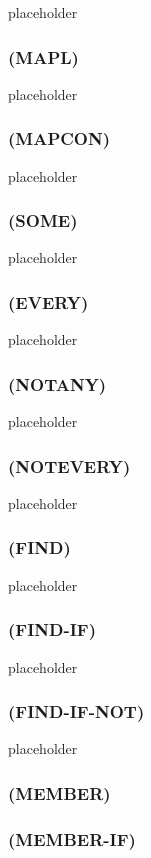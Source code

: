 \documentclass[11pt]{article}
\begin{document}
placeholder
\subsubsection{(MAPL)}
\label{sec-4-15-5}

placeholder
\subsubsection{(MAPCON)}
\label{sec-4-15-6}

placeholder
\subsubsection{(SOME)}
\label{sec-4-15-7}

placeholder
\subsubsection{(EVERY)}
\label{sec-4-15-8}

placeholder
\subsubsection{(NOTANY)}
\label{sec-4-15-9}

placeholder
\subsubsection{(NOTEVERY)}
\label{sec-4-15-10}

placeholder
\subsubsection{(FIND)}
\label{sec-4-15-11}

placeholder
\subsubsection{(FIND-IF)}
\label{sec-4-15-12}

placeholder
\subsubsection{(FIND-IF-NOT)}
\label{sec-4-15-13}

placeholder
\subsubsection{(MEMBER)}
\label{sec-4-15-14}
\subsubsection{(MEMBER-IF)}
\label{sec-4-15-15}
\end{document}
